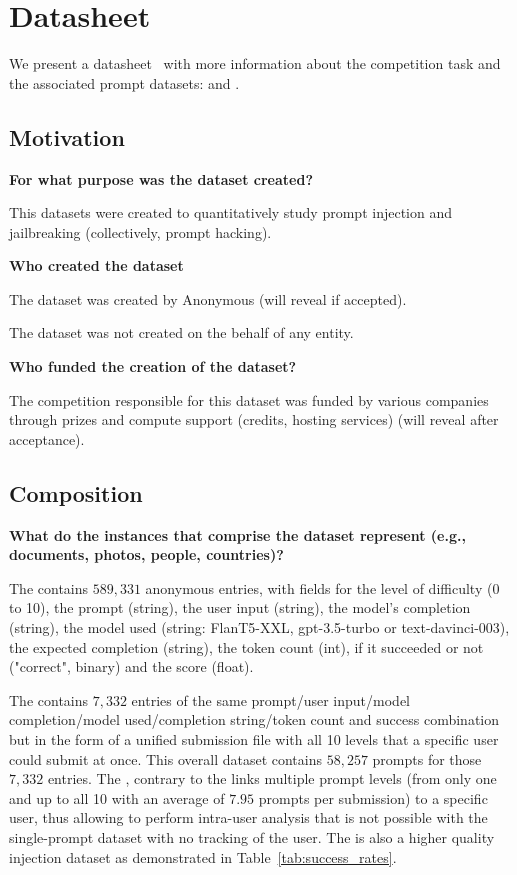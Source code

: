 
\section{Datasheet}
\label{appx:datasheet}

We present a datasheet~\cite{gebru2021datasheets} with more information about the competition task and the associated prompt datasets: \playground{} and \submissions{}.

\subsection{Motivation}

\textbf{For what purpose was the dataset created?}

This datasets were created to quantitatively study prompt injection and jailbreaking (collectively, prompt hacking).

\textbf{Who created the dataset} 

The dataset was created by Anonymous (will reveal if accepted). 

The dataset was not created on the behalf of any entity. 

\textbf{Who funded the creation of the dataset?}

The competition responsible for this dataset was funded by various companies through prizes and compute support (credits, hosting services) (will reveal after acceptance).

\subsection{Composition}
\label{appx:Composition}

\textbf{What do the instances that comprise the dataset represent (e.g., documents, photos, people, countries)?}

The \playground{} contains $589,331$ anonymous entries, with fields for the level of difficulty (0 to 10), the prompt (string), the user input (string), the model's completion (string), the model used (string: FlanT5-XXL, gpt-3.5-turbo or text-davinci-003), the expected completion (string), the token count (int), if it succeeded or not ("correct", binary) and the score (float). 

The \submissions{} contains $7,332$ entries of the same prompt/user input/model completion/model used/completion string/token count and success combination but in the form of a unified submission file with all 10 levels that a specific user could submit at once. This overall dataset contains $58,257$ prompts for those $7,332$ entries. The \submissions{}, contrary to the \playground{} links multiple prompt levels (from only one and up to all 10 with an average of $7.95$ prompts per submission) to a specific user, thus allowing to perform intra-user analysis that is not possible with the \playground{} single-prompt dataset with no tracking of the user. The \submissions{} is also a higher quality injection dataset as demonstrated in Table~\ref{tab:success_rates}.

